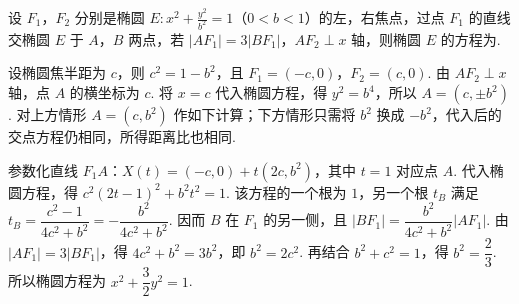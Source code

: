 \begin{problem}
设 \(F_{1}\)，\(F_{2}\) 分别是椭圆 \(E: x^{2} + \frac{y^{2}}{b^{2}} = 1\)（\(0 < b < 1\)）的左，右焦点，过点 \(F_{1}\) 的直线交椭圆 \(E\) 于 \(A\)，\(B\) 两点，若 \(|AF_{1}| = 3|BF_{1}|\)，\(AF_{2} \perp x\) 轴，则椭圆 \(E\) 的方程为\fillinblank{}.


\begin{solution}
设椭圆焦半距为 \(c\)，则 \(c^{2}=1-b^{2}\)，且 \(F_{1}=(-c,0)\)，\(F_{2}=(c,0)\). 由 \(AF_{2}\perp x\) 轴，点 \(A\) 的横坐标为 \(c\). 将 \(x=c\) 代入椭圆方程，得 \(y^{2}=b^{4}\)，所以 \(A=(c,\pm b^{2})\). 对上方情形 \(A=(c,b^{2})\) 作如下计算；下方情形只需将 \(b^{2}\) 换成 \(-b^{2}\)，代入后的交点方程仍相同，所得距离比也相同.

参数化直线 \(F_{1}A\)：\(X(t)=(-c,0)+t(2c,b^{2})\)，其中 \(t=1\) 对应点 \(A\). 代入椭圆方程，得 \(c^{2}(2t-1)^{2}+b^{2}t^{2}=1\). 该方程的一个根为 \(1\)，另一个根 \(t_B\) 满足 \(t_B=\dfrac{c^{2}-1}{4c^{2}+b^{2}}=-\dfrac{b^{2}}{4c^{2}+b^{2}}\). 因而 \(B\) 在 \(F_1\) 的另一侧，且 \(\lvert BF_1\rvert=\dfrac{b^{2}}{4c^{2}+b^{2}}\lvert AF_1\rvert\). 由 \(\lvert AF_1\rvert=3\lvert BF_1\rvert\)，得 \(4c^{2}+b^{2}=3b^{2}\)，即 \(b^{2}=2c^{2}\). 再结合 \(b^{2}+c^{2}=1\)，得 \(b^{2}=\dfrac23\). 所以椭圆方程为 \(x^{2}+\dfrac{3}{2}y^{2}=1\).
\end{solution}
\end{problem}

